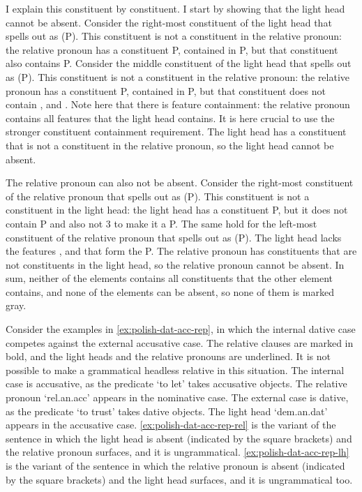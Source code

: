 I explain this constituent by constituent.
I start by showing that the light head cannot be absent.
Consider the right-most constituent of the light head that spells out as  (P). This constituent is not a constituent in the relative pronoun: the relative pronoun has a constituent P, contained in P, but that constituent also contains P.
Consider the middle constituent of the light head that spells out as  (P). This constituent is not a constituent in the relative pronoun: the relative pronoun has a constituent P, contained in P, but that constituent does not contain ,  and .
Note here that there is feature containment: the relative pronoun contains all features that the light head contains. It is here crucial to use the stronger constituent containment requirement.
The light head has a constituent that is not a constituent in the relative pronoun, so the light head cannot be absent.

The relative pronoun can also not be absent.
Consider the right-most constituent of the relative pronoun that spells out as  (P). This constituent is not a constituent in the light head: the light head has a constituent P, but it does not contain P and also not 3 to make it a P.
The same hold for the left-most constituent of the relative pronoun that spells out as  (P). The light head lacks the features ,  and  that form the P.
The relative pronoun has constituents that are not constituents in the light head, so the relative pronoun cannot be absent.
In sum, neither of the elements contains all constituents that the other element contains, and none of the elements can be absent, so none of them is marked gray.

Consider the examples in \ref{ex:polish-dat-acc-rep}, in which the internal dative case competes against the external accusative case. The relative clauses are marked in bold, and the light heads and the relative pronouns are underlined. It is not possible to make a grammatical headless relative in this situation.
The internal case is accusative, as the predicate  `to let' takes accusative objects. The relative pronoun  `\ac{rel}.\ac{an}.\ac{acc}' appears in the nominative case.
The external case is dative, as the predicate  `to trust' takes dative objects. The light head  `\ac{dem}.\ac{an}.\ac{dat}' appears in the accusative case.
\ref{ex:polish-dat-acc-rep-rel} is the variant of the sentence in which the light head is absent (indicated by the square brackets) and the relative pronoun surfaces, and it is ungrammatical.
\ref{ex:polish-dat-acc-rep-lh} is the variant of the sentence in which the relative pronoun is absent (indicated by the square brackets) and the light head surfaces, and it is ungrammatical too.

